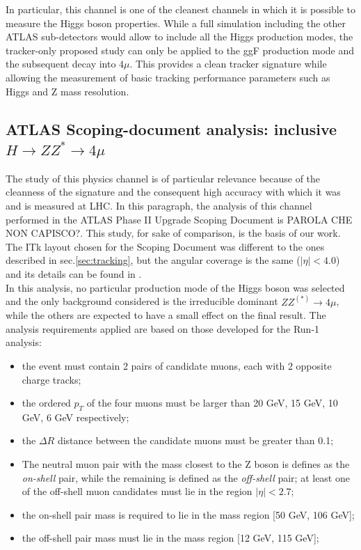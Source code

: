 \documentclass[a4paper,twoside,12pt]{article}
\begin{document}
In particular, this channel is one of the cleanest channels in which it is possible to measure the Higgs boson properties. While a full 
simulation including the other ATLAS sub-detectors would allow to include all the Higgs
production modes, the tracker-only proposed study can only
be applied to the ggF production mode and the subsequent decay into $4\mu$. This provides a clean tracker signature while
allowing the measurement of basic tracking performance parameters such as Higgs and Z mass resolution.

\subsection{ATLAS Scoping-document analysis: inclusive $H \rightarrow ZZ^* \rightarrow 4\mu$}\label{subsec:physics:scoping}
The study of this physics channel is of particular relevance because of the cleanness of the signature and the consequent high accuracy with which it was and is measured at LHC. In this paragraph, the analysis of this channel performed in the ATLAS Phase II Upgrade
Scoping Document\cite{scoping_HZZ4mu} is PAROLA CHE NON CAPISCO?. This study, for sake of comparison, is the basis of our work.\\

The ITk layout chosen for the Scoping Document was different to the ones described in sec.\ref{sec:tracking}, but the angular coverage is the same ($|\eta| < 4.0$) and its details
can be found in \cite{scoping}.\\

In this analysis, no particular production mode of the Higgs boson was selected and the only background considered is the irreducible dominant $ZZ^{(*)} \rightarrow 4\mu$, while the others are
expected to have a small effect on the final result. The analysis requirements applied are based on those developed for the Run-1 analysis:

\begin{itemize}
\item the event must contain 2 pairs of candidate muons, each with 2
opposite charge tracks;
\item the ordered $p_T$ of the four muons must be larger than 20 GeV, 15 GeV, 10 GeV, 6 GeV respectively;
\item the $\Delta R$ distance between the candidate muons must be greater than 0.1;
\item The neutral muon pair with the mass closest to the Z boson is defines as the \textit{on-shell} pair, while the remaining is defined as the \textit{off-shell} pair;
 at least one of the off-shell muon candidates must lie in the
region $|\eta| < 2.7$;	
\item the on-shell pair mass is required to lie in the mass region [50 GeV, 106 GeV];
\item the off-shell pair mass must lie in the mass region [12 GeV, 115 GeV];
\end{itemize}
\end{document}
